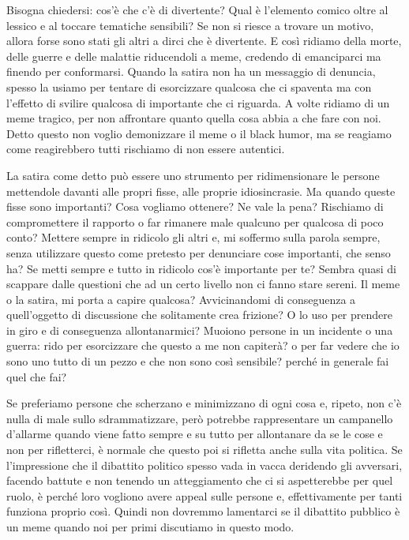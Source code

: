 \documentclass[12pt]{book} %
\begin{document}
\begin{mdframed}[linewidth=1pt]
Bisogna chiedersi: cos'è che c'è di divertente? Qual è l'elemento comico oltre al lessico e al
toccare tematiche sensibili? Se non si riesce a trovare un motivo, allora forse sono stati gli altri a dirci che è
divertente. E così ridiamo della morte, delle guerre e delle malattie riducendoli a meme, credendo di emanciparci ma
finendo per conformarsi. Quando la satira non ha un messaggio di denuncia, spesso la usiamo per tentare di esorcizzare
qualcosa che ci spaventa ma con l'effetto di svilire qualcosa di importante che ci riguarda. A volte ridiamo di un meme
tragico, per non affrontare quanto quella cosa abbia a che fare con noi. Detto questo non voglio demonizzare il meme o
il black humor, ma se reagiamo come reagirebbero tutti rischiamo di non essere autentici.

La satira come detto può essere uno strumento per ridimensionare le persone mettendole davanti alle propri fisse, alle proprie idiosincrasie. Ma quando queste fisse sono importanti? Cosa vogliamo ottenere? Ne vale la pena? Rischiamo di compromettere il rapporto o far rimanere male qualcuno per qualcosa di poco conto? Mettere sempre in ridicolo gli altri e, mi soffermo sulla parola sempre, senza utilizzare questo come pretesto per denunciare cose importanti, che senso ha? Se metti sempre e tutto in ridicolo cos'è importante per te? Sembra quasi di scappare dalle questioni che ad un certo livello non ci fanno stare sereni.
Il meme o la satira, mi porta a capire qualcosa? Avvicinandomi di conseguenza a quell'oggetto di discussione che solitamente crea frizione? O lo uso per prendere in giro e di conseguenza allontanarmici? Muoiono persone in un incidente o una guerra: rido per esorcizzare che questo a me non capiterà? o per far vedere che io sono uno tutto di un pezzo e che non sono così sensibile? perché in generale fai quel che fai?

Se preferiamo persone che scherzano e minimizzano di ogni cosa e, ripeto, non c'è nulla di male sullo sdrammatizzare, però potrebbe rappresentare un campanello d'allarme quando viene fatto sempre e su tutto per allontanare da se le cose e non per rifletterci, è normale che questo poi si rifletta anche sulla vita politica. Se l'impressione che il dibattito politico spesso vada in vacca deridendo gli avversari, facendo battute e non tenendo un atteggiamento che ci si aspetterebbe per quel ruolo, è perché loro vogliono avere appeal sulle persone e, effettivamente per tanti funziona proprio così.
Quindi non dovremmo lamentarci se il dibattito pubblico è un meme quando noi per primi discutiamo in questo modo.


\end{mdframed}
\end{document}
